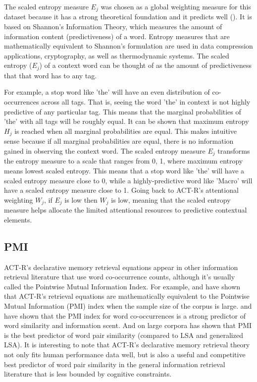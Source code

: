 \documentclass[10pt,letterpaper]{article}
\begin{document}
The scaled entropy measure $E_{j}$ was chosen as a global weighting measure for this dataset because it has a strong theoretical foundation and it predicts well ().
It is based on Shannon's Information Theory, which measures the amount of information content (predictiveness) of a word.
Entropy measures that are mathematically equivalent to Shannon's formulation are used in data compression applications, cryptography, as well as thermodynamic systems.
The scaled entropy ($E_{j}$) of a context word can be thought of as the amount of predictiveness that that word has to any tag.

For example, a stop word like 'the' will have an even distribution of co-occurrences across all tags.
That is, seeing the word 'the' in context is not highly predictive of any particular tag.
This means that the marginal probabilities of 'the' with all tags will be roughly equal.
It can be shown that maximum entropy $H_{j}$ is reached when all marginal probabilities are equal.
This makes intuitive sense because if all marginal probabilities are equal, there is no information gained in observing the context word.
The scaled entropy measure $E_{j}$ transforms the entropy measure to a scale that ranges from 0, 1, where maximum entropy means lowest scaled entropy.
This means that a stop word like 'the' will have a scaled entropy measure close to 0, while a highly-predictive word like 'Macro' will have a scaled entropy measure close to 1.
Going back to ACT-R's attentional weighting $W_{j}$, if $E_{j}$ is low then $W_{j}$ is low, meaning that the scaled entropy measure helps allocate the limited attentional resources to predictive contextual elements.

\subsection{PMI}

ACT-R's declarative memory retrieval equations appear in other information retrieval literature that use word co-occurrence counts, although it's usually called the Pointwise Mutual Information Index.
For example,  and  have shown that ACT-R's retrieval equations are mathematically equivalent to the Pointwise Mutual Information (PMI) index when the sample size of the corpus is large.
 and  have shown that the PMI index for word co-occurrences is a strong predictor of word similarity and information scent.
And on large corpora  has shown that PMI is the best predictor of word pair similarity (compared to LSA and generalized LSA).
It is interesting to note that ACT-R's declarative memory retrieval theory not only fits human performance data well, but is also a useful and competitive best predictor of word pair similarity in the general information retrieval literature that is less bounded by cognitive constraints.
\end{document}
